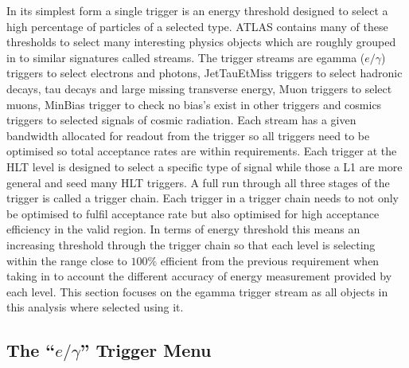 	In its simplest form a single trigger is an energy threshold designed to select a high percentage of particles of a selected type. ATLAS contains many of these thresholds to select many interesting physics objects which are roughly grouped in to similar signatures called streams. The trigger streams are egamma ($e/\gamma$) triggers to select electrons and photons, JetTauEtMiss triggers to select hadronic decays, tau decays and large missing transverse energy, Muon triggers to select muons, MinBias trigger to check no bias's exist in other triggers and cosmics triggers to selected signals of cosmic radiation. Each stream has a given bandwidth allocated for readout from the trigger so all triggers need to be optimised so total acceptance rates are within requirements. Each trigger at the HLT level is designed to select a specific type of signal while those a L1 are more general and seed many HLT triggers. A full run through all three stages of the trigger is called a trigger chain. Each trigger in a trigger chain needs to not only be optimised to fulfil acceptance rate but also optimised for high acceptance efficiency in the valid region. In terms of energy threshold this means an increasing threshold through the trigger chain so that each level is selecting within the range close to $100\%$ efficient from the previous requirement when taking in to account the different accuracy of energy measurement provided by each level. This section focuses on the egamma trigger stream as all objects in this analysis where selected using it.





	\subsection{The ``$e/\gamma$'' Trigger Menu} 
		\label{sec:egammaMenu}

